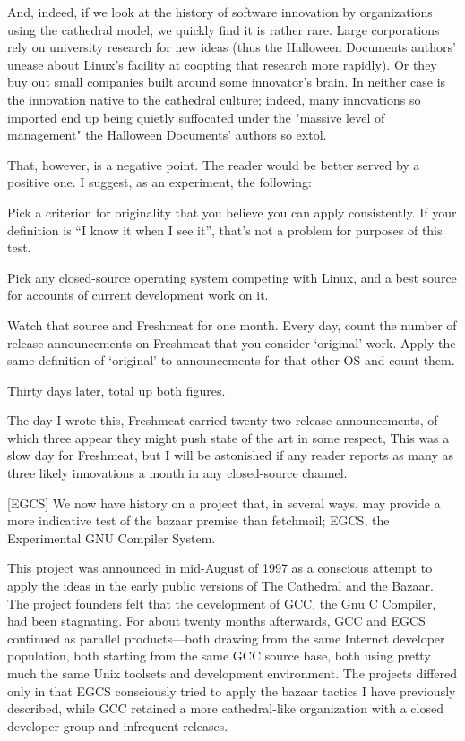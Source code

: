 \documentclass[a4paper,12pt,UTF8,twoside]{ctexbook}
\begin{document}
And, indeed, if we look at the history of software innovation by organizations using the cathedral model, we quickly find it is rather rare. Large corporations rely on university research for new ideas (thus the Halloween Documents authors' unease about Linux's facility at coopting that research more rapidly). Or they buy out small companies built around some innovator's brain. In neither case is the innovation native to the cathedral culture; indeed, many innovations so imported end up being quietly suffocated under the "massive level of management" the Halloween Documents' authors so extol.

That, however, is a negative point. The reader would be better served by a positive one. I suggest, as an experiment, the following:

Pick a criterion for originality that you believe you can apply consistently. If your definition is ``I know it when I see it'', that's not a problem for purposes of this test.

Pick any closed-source operating system competing with Linux, and a best source for accounts of current development work on it.

Watch that source and Freshmeat for one month. Every day, count the number of release announcements on Freshmeat that you consider `original' work. Apply the same definition of `original' to announcements for that other OS and count them.

Thirty days later, total up both figures.

The day I wrote this, Freshmeat carried twenty-two release announcements, of which three appear they might push state of the art in some respect, This was a slow day for Freshmeat, but I will be astonished if any reader reports as many as three likely innovations a month in any closed-source channel.

[EGCS] We now have history on a project that, in several ways, may provide a more indicative test of the bazaar premise than fetchmail; EGCS, the Experimental GNU Compiler System.

This project was announced in mid-August of 1997 as a conscious attempt to apply the ideas in the early public versions of The Cathedral and the Bazaar. The project founders felt that the development of GCC, the Gnu C Compiler, had been stagnating. For about twenty months afterwards, GCC and EGCS continued as parallel products—both drawing from the same Internet developer population, both starting from the same GCC source base, both using pretty much the same Unix toolsets and development environment. The projects differed only in that EGCS consciously tried to apply the bazaar tactics I have previously described, while GCC retained a more cathedral-like organization with a closed developer group and infrequent releases.
\end{document}
